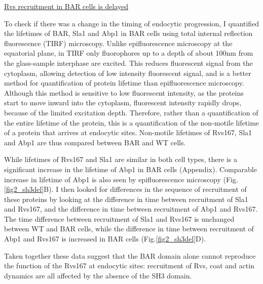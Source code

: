 	\vspace{5mm}
		\underline{Rvs recruitment in BAR cells is delayed}
		
To check if there was a change in the timing of endocytic progression, I quantified the lifetimes of BAR, Sla1 and Abp1 in BAR cells using total internal reflection fluorescence (TIRF) microscopy. Unlike epifluorescence microscopy at the equatorial plane, in TIRF only fluorophores up to a depth of about 100nm from the glass-sample interphase are excited. This reduces fluorescent signal from the cytoplasm, allowing detection of low intensity fluorescent signal, and is a better method for quantification of protein lifetime than epifluorescence microscopy. Although this method is sensitive to low fluorescent intensity, as the proteins start to move inward into the cytoplasm, fluorescent intensity rapidly drops, because of the limited excitation depth. Therefore, rather than a quantification of the entire lifetime of the protein, this is a quantification of the non-motile lifetime of a protein that arrives at endocytic sites. Non-motile lifetimes of Rvs167, Sla1 and Abp1 are thus compared between BAR and WT cells. 

\newpage
While lifetimes of Rvs167 and Sla1 are similar in both cell types, there is a significant increase in the lifetime of Abp1 in BAR cells (Appendix). Comparable increase in lifetime of Abp1 is also seen by epifluorescence microscopy (Fig.\ref{fig2_sh3del}B). I then looked for differences in the sequence of recruitment of these proteins by looking at the difference in time between recruitment of Sla1 and Rvs167, and the difference in time between recruitment of Abp1 and Rvs167. The time difference between recruitment of Sla1 and Rvs167 is unchanged between WT and BAR cells, while the difference in time between recruitment of Abp1 and Rvs167 is increased in BAR cells  (Fig.\ref{fig2_sh3del}D).

	\vspace{5mm}
Taken together these data suggest that the BAR domain alone cannot reproduce the function of the Rvs167 at endocytic sites: recruitment of Rvs, coat and actin dynamics are all affected by the absence of the SH3 domain. 


